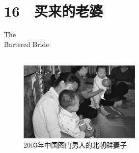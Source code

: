 \fancyhead[RO]{{\tiny{\textcolor{Gray}{\FA \ }}}\thepage}
\fancyhead[LE]{{\tiny{\textcolor{Gray}{\FA \ }}}\thepage}
\fancyfoot[LE,RO]{}
\fancyfoot[LO,CE]{}
\fancyfoot[CO,RE]{}
\chapter*{16 {\FA } 买来的老婆}
\vspace{15mm}
\begin{flushright}
	\textcolor{PinYinColor}{\EN \huge{The\\
	Bartered Bride\\
	\ \\}}
\end{flushright}

\begin{figure}[!htbp]
\centering
\includegraphics[width=6cm]{./Chapters/Images/16.jpg}
\caption*{2003年中国图门男人的北朝鲜妻子}
\end{figure}

